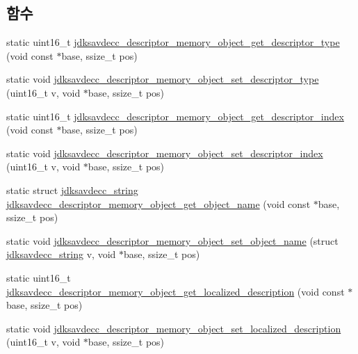 \subsection*{함수}
\begin{DoxyCompactItemize}
\item 
static uint16\+\_\+t \hyperlink{group__descriptor__memory__object_ga4ba681d68c1e610b31721bb134a863e2}{jdksavdecc\+\_\+descriptor\+\_\+memory\+\_\+object\+\_\+get\+\_\+descriptor\+\_\+type} (void const $\ast$base, ssize\+\_\+t pos)
\item 
static void \hyperlink{group__descriptor__memory__object_ga8af0341f923c2b3c33b5d39263ff40d1}{jdksavdecc\+\_\+descriptor\+\_\+memory\+\_\+object\+\_\+set\+\_\+descriptor\+\_\+type} (uint16\+\_\+t v, void $\ast$base, ssize\+\_\+t pos)
\item 
static uint16\+\_\+t \hyperlink{group__descriptor__memory__object_ga1a5e3258584bf1095c4c5a59cb7f9da0}{jdksavdecc\+\_\+descriptor\+\_\+memory\+\_\+object\+\_\+get\+\_\+descriptor\+\_\+index} (void const $\ast$base, ssize\+\_\+t pos)
\item 
static void \hyperlink{group__descriptor__memory__object_ga4e422f16b4b4e84f1063a7d6dfaa958d}{jdksavdecc\+\_\+descriptor\+\_\+memory\+\_\+object\+\_\+set\+\_\+descriptor\+\_\+index} (uint16\+\_\+t v, void $\ast$base, ssize\+\_\+t pos)
\item 
static struct \hyperlink{structjdksavdecc__string}{jdksavdecc\+\_\+string} \hyperlink{group__descriptor__memory__object_gae66213e78842bf5215167cf71ae948a3}{jdksavdecc\+\_\+descriptor\+\_\+memory\+\_\+object\+\_\+get\+\_\+object\+\_\+name} (void const $\ast$base, ssize\+\_\+t pos)
\item 
static void \hyperlink{group__descriptor__memory__object_ga91e90687bb86a44e44ab3ab0ca2238f5}{jdksavdecc\+\_\+descriptor\+\_\+memory\+\_\+object\+\_\+set\+\_\+object\+\_\+name} (struct \hyperlink{structjdksavdecc__string}{jdksavdecc\+\_\+string} v, void $\ast$base, ssize\+\_\+t pos)
\item 
static uint16\+\_\+t \hyperlink{group__descriptor__memory__object_gabdaad53ba24e023cc7f1cfa9d26d4426}{jdksavdecc\+\_\+descriptor\+\_\+memory\+\_\+object\+\_\+get\+\_\+localized\+\_\+description} (void const $\ast$base, ssize\+\_\+t pos)
\item 
static void \hyperlink{group__descriptor__memory__object_ga59e06c2369ca02c274e837c84dbe13c0}{jdksavdecc\+\_\+descriptor\+\_\+memory\+\_\+object\+\_\+set\+\_\+localized\+\_\+description} (uint16\+\_\+t v, void $\ast$base, ssize\+\_\+t pos)
\item 

\end{DoxyCompactItemize}
